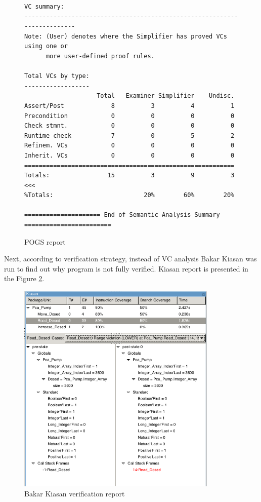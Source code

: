 \begin{figure}
\begin{lstlisting}[frame=single, gobble=0]
VC summary:
-------------------------------------------------------------------------
Note: (User) denotes where the Simplifier has proved VCs using one or
      more user-defined proof rules.

Total VCs by type:
------------------
                    Total   Examiner Simplifier    Undisc.
Assert/Post             8          3          4          1
Precondition            0          0          0          0
Check stmnt.            0          0          0          0
Runtime check           7          0          5          2
Refinem. VCs            0          0          0          0
Inherit. VCs            0          0          0          0
==========================================================
Totals:                15          3          9          3 <<<
%Totals:                         20%        60%        20%

===================== End of Semantic Analysis Summary ========================
\end{lstlisting}
\doublespacing
\caption{POGS report}
\label{listing:pcapump_dosemonitor_pogs}
\end{figure}

Next, according to verification strategy, instead of VC analysis Bakar Kiasan was run to find out why program is not fully verified. Kiasan report is presented in the Figure \ref{figure:sparkverification:kiasanreport1}.

\begin{figure}[ht]%
    \begin{center}
        \includegraphics[width=0.85\textwidth]{figures/pca-pump-verification-step1.png}        
    \end{center}    
    \caption{Bakar Kiasan verification report}
    \label{figure:sparkverification:kiasanreport1}
\end{figure}

